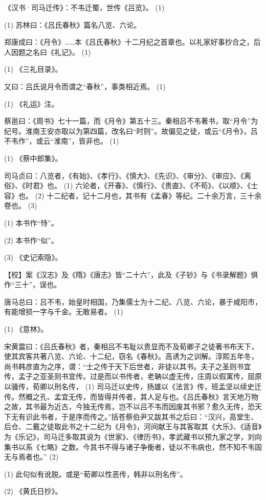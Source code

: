 \documentclass[12pt,UTF8]{ctexbook}
\begin{document}
《汉书·司马迁传》：不韦迁蜀，世传《吕览》。 (1)

(1) 苏林曰：《吕氏春秋》篇名八览、六论。

郑康成曰：《月令》……本《吕氏春秋》十二月纪之首章也。以礼家好事抄合之，后人因题之名曰《礼记》。 (1)

(1) 《三礼目录》。

又曰：吕氏说月令而谓之“春秋”，事类相近焉。 (1)

(1) 《礼运》注。

蔡邕曰：《周书》七十一篇，而《月令》第五十三。秦相吕不韦著书，取“月令”为纪号。淮南王安亦取以为第四篇，改名曰“时则”。故偏见之徒，或云“《月令》，吕不韦作”，或云“淮南”，皆非也。 (1)

(1) 《蔡中郎集》。

司马贞曰：八览者，《有始》、《孝行》、《慎大》、《先识》、《审分》、《审应》、《离俗》、《时君》也。 (1) 六论者，《开春》、《慎行》、《贵直》、《不苟》、《以顺》、《士容》也。 (2) 十二纪者，记十二月也，其书有《孟春》等纪。二十余万言，三十余卷也。 (3)

(1) 本书作“恃”。

(2) 本书作“似”。

(3) 《史记索隐》。

【校】案《汉志》及《隋》《唐志》皆“二十六”，此及《子钞》与《书录解题》俱作“三十”，误也。

唐马总曰：吕不韦，始皇时相国，乃集儒士为十二纪、八览、六论，暴于咸阳市，有能增损一字与千金。无敢易者。 (1)

(1) 《意林》。

宋黄震曰：《吕氏春秋》者，秦相吕不韦耻以贵显而不及荀卿子之徒著书布天下，使其宾客共著八览、六论、十二纪，窃名《春秋》。高诱为之训解。淳熙五年冬，尚书韩彦直为之序，谓：“士之传于天下后世者，非徒以其书。夫子之圣则书宜传，孟子之亚圣则书宜传。过是而以书传者，老聃以虚无传，庄周以假寓传，屈原以骚传，荀卿以刑名传， (1) 司马迁以史传，扬雄以《法言》传，班孟坚以续史迁传。然概之孔、孟宜无传，而皆得并传者，其人足与也。《吕氏春秋》言天地万物之故，其书最为近古，今独无传焉，岂不以吕不韦而因废其书邪？愈久无传，恐天下无有识此书者，于是序而传之。”括苍蔡伯尹又跋其书之后曰：“汉兴，高堂生、后仓、二戴之徒取此书之十二纪为《月令》，河间献王与其客取其《大乐》、《适音》为《乐记》，司马迁多取其说为《世家》、《律历书》，孝武藏书以预九家之学，刘向集书以系《七略》之数。今其书不得与诸子争衡者，徒以不韦病也，然不知不韦固无与焉者也。” (2)

(1) 此句似有讹脱。或是“荀卿以性恶传，韩非以刑名传”。

(2) 《黄氏日抄》。
\end{document}
